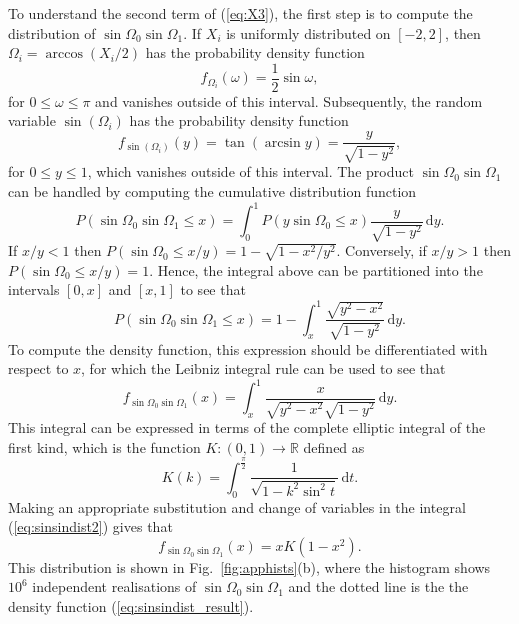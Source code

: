 \documentclass[nofootinbib,prb,amsmath,amssymb,twocolumn,floatfix]{revtex4-2}
\theoremstyle{definition}
\newcommand{\de}{\,\mathrm{d}}
\begin{document}
To understand the second term of (\ref{eq:X3}), the first step is to compute the distribution of $\sin\Omega_0\sin\Omega_1$. If $X_i$ is uniformly distributed on $[-2,2]$, then $\Omega_i=\arccos(X_i/2)$ has the probability density function
\begin{equation} \label{eq:omegadist}
	f_{\Omega_i}(\omega) = \frac{1}{2} \sin\omega,
\end{equation} 
for $0\leq\omega\leq\pi$ and vanishes outside of this interval. Subsequently, the random variable $\sin(\Omega_i)$ has the probability density function
\begin{equation} \label{eq:sinomegadist}
	f_{\sin(\Omega_i)}(y) = \tan(\arcsin y) = \frac{y}{\sqrt{1-y^2}},
\end{equation}
for $0\leq y\leq1$, which vanishes outside of this interval. The product $\sin\Omega_0\sin\Omega_1$ can be handled by computing the cumulative distribution function
\begin{equation*} 
	P(\sin\Omega_0\sin\Omega_1\leq x) = \int_0^1 P(y \sin\Omega_0\leq x) \frac{y}{\sqrt{1-y^2}}\de y.
\end{equation*}
If $x/y<1$ then $P(\sin\Omega_0\leq x/y)=1-\sqrt{1-x^2/y^2}$. Conversely, if $x/y>1$ then $P(\sin\Omega_0\leq x/y)=1$. Hence, the integral above can be partitioned into the intervals $[0,x]$ and $[x,1]$ to see that 
\begin{equation} 
	P(\sin\Omega_0\sin\Omega_1\leq x) = 1-\int_x^1 \frac{\sqrt{y^2-x^2}}{\sqrt{1-y^2}} \de y.
\end{equation}
To compute the density function, this expression should be differentiated with respect to $x$, for which the Leibniz integral rule can be used to see that 
\begin{equation} \label{eq:sinsindist2}
	f_{\sin\Omega_0\sin\Omega_1}(x) = \int_x^1 \frac{x}{\sqrt{y^2-x^2}\sqrt{1-y^2}} \de y.
\end{equation}
This integral can be expressed in terms of the complete elliptic integral of the first kind, which is the function $K:(0,1)\to\mathbb{R}$ defined as \cite{abramowitz1948handbook}
\begin{equation}
	K(k)=\int_0^{\frac{\pi}{2}} \frac{1}{\sqrt{1-k^2\sin^2 t}} \de t.
\end{equation}
Making an appropriate substitution and change of variables in the integral (\ref{eq:sinsindist2}) gives that
\begin{equation} \label{eq:sinsindist_result}
	f_{\sin\Omega_0\sin\Omega_1}(x) = xK(1-x^2).
\end{equation}
This distribution is shown in Fig.~\ref{fig:apphists}(b), where the histogram shows $10^6$ independent realisations of $\sin\Omega_0\sin\Omega_1$ and the dotted line is the the density function (\ref{eq:sinsindist_result}).
\end{document}
